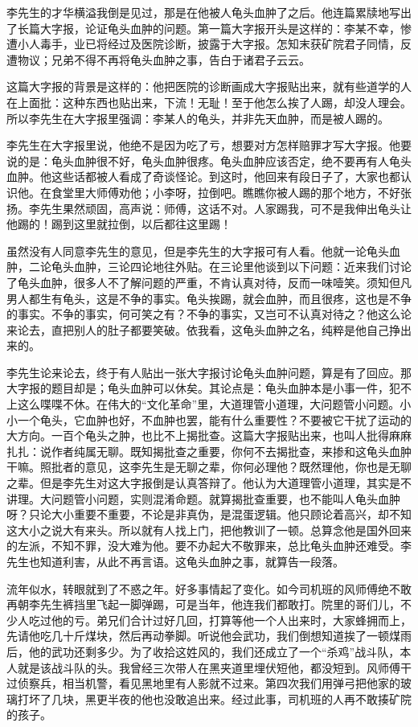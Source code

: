 李先生的才华横溢我倒是见过，那是在他被人龟头血肿了之后。他连篇累牍地写出了长篇大字报，论证龟头血肿的问题。第一篇大字报开头是这样的：李某不幸，惨遭小人毒手，业已将经过及医院诊断，披露于大字报。怎知末获矿院君子同情，反遭物议；兄弟不得不再将龟头血肿之事，告白于诸君子云云。

这篇大字报的背景是这样的：他把医院的诊断画成大字报贴出来，就有些道学的人在上面批：这种东西也贴出来，下流！无耻！至于他怎么挨了人踢，却没人理会。所以李先生在大字报里强调：李某人的龟头，并非先天血肿，而是被人踢的。 

李先生在大字报里说，他绝不是因为吃了亏，想要对方怎样赔罪才写大字报。他要说的是：龟头血肿很不好，龟头血肿很疼。龟头血肿应该否定，绝不要再有人龟头血肿。他这些话都被人看成了奇谈怪论。到这时，他回来有段日子了，大家也都认识他。在食堂里大师傅劝他；小李呀，拉倒吧。瞧瞧你被人踢的那个地方，不好张扬。李先生果然顽固，高声说：师傅，这话不对。人家踢我，可不是我伸出龟头让他踢的！踢到这里就拉倒，以后都往这里踢！ 


虽然没有人同意李先生的意见，但是李先生的大字报可有人看。他就一论龟头血肿，二论龟头血肿，三论四论地往外贴。在三论里他谈到以下问题：近来我们讨论了龟头血肿，很多人不了解问题的严重，不肯认真对待，反而一味噎笑。须知但凡男人都生有龟头，这是不争的事实。龟头挨踢，就会血肿，而且很疼，这也是不争的事实。不争的事实，何可笑之有？不争的事实，又岂可不认真对待之？他这么论来论去，直把别人的肚子都要笑破。依我看，这龟头血肿之名，纯粹是他自己挣出来的。 

李先生论来论去，终于有人贴出一张大字报讨论龟头血肿问题，算是有了回应。那大字报的题目却是；龟头血肿可以休矣。其论点是：龟头血肿本是小事一件，犯不上这么喋喋不休。在伟大的“文化革命”里，大道理管小道理，大问题管小问题。小小一个龟头，它血肿也好，不血肿也罢，能有什么重要性？不要被它干扰了运动的大方向。一百个龟头之肿，也比不上揭批查。这篇大字报贴出来，也叫人批得麻麻扎扎：说作者纯属无聊。既知揭批查之重要，你何不去揭批查，来掺和这龟头血肿干嘛。照批者的意见，这李先生是无聊之辈，你何必理他？既然理他，你也是无聊之辈。但是李先生对这大字报倒是认真答辩了。他认为大道理管小道理，其实是不讲理。大问题管小问题，实则混淆命题。就算揭批查重要，也不能叫人龟头血肿呀？只论大小重要不重要，不论是非真伪，是混蛋逻辑。他只顾论着高兴，却不知这大小之说大有来头。所以就有人找上门，把他教训了一顿。总算念他是国外回来的左派，不知不罪，没大难为他。要不办起大不敬罪来，总比龟头血肿还难受。李先生也知道利害，从此不再言语。这龟头血肿之事，就算告一段落。 

流年似水，转眼就到了不惑之年。好多事情起了变化。如今司机班的风师傅绝不敢再朝李先生裤挡里飞起一脚弹踢，可是当年，他连我们都敢打。院里的哥们儿，不少人吃过他的亏。弟兄们合计过好几回，打算等他一个人出来时，大家蜂拥而上，先请他吃几十斤煤块，然后再动拳脚。听说他会武功，我们倒想知道挨了一顿煤雨后，他的武功还剩多少。为了收拾这姓风的，我们还成立了一个“杀鸡”战斗队，本人就是该战斗队的头。我曾经三次带人在黑夹道里埋伏短他，都没短到。风师傅干过侦察兵，相当机警，看见黑地里有人影就不过来。第四次我们用弹弓把他家的玻璃打坏了几块，黑更半夜的他也没敢追出来。经过此事，司机班的人再不敢揍矿院的孩子。 

